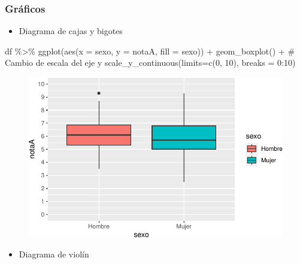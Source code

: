\documentclass[
  a4paper,
]{scrreport}
\newenvironment{Shaded}{\begin{snugshade}}{\end{snugshade}}
\newcommand{\AttributeTok}[1]{\textcolor[rgb]{0.40,0.45,0.13}{#1}}
\newcommand{\CommentTok}[1]{\textcolor[rgb]{0.37,0.37,0.37}{#1}}
\newcommand{\DecValTok}[1]{\textcolor[rgb]{0.68,0.00,0.00}{#1}}
\newcommand{\FunctionTok}[1]{\textcolor[rgb]{0.28,0.35,0.67}{#1}}
\newcommand{\NormalTok}[1]{\textcolor[rgb]{0.00,0.23,0.31}{#1}}
\newcommand{\SpecialCharTok}[1]{\textcolor[rgb]{0.37,0.37,0.37}{#1}}
\providecommand{\tightlist}{%
  \setlength{\itemsep}{0pt}\setlength{\parskip}{0pt}}\usepackage{longtable,booktabs,array}
\theoremstyle{definition}
\theoremstyle{definition}
\theoremstyle{remark}
\begin{document}
\hypertarget{gruxe1ficos-2}{%
\subsubsection{Gráficos}\label{gruxe1ficos-2}}

\begin{itemize}
\tightlist
\item
  Diagrama de cajas y bigotes
\end{itemize}

\begin{Shaded}
\begin{Highlighting}[]
\NormalTok{df }\SpecialCharTok{\%\textgreater{}\%} \FunctionTok{ggplot}\NormalTok{(}\FunctionTok{aes}\NormalTok{(}\AttributeTok{x =}\NormalTok{ sexo, }\AttributeTok{y =}\NormalTok{ notaA, }\AttributeTok{fill =}\NormalTok{ sexo)) }\SpecialCharTok{+} 
  \FunctionTok{geom\_boxplot}\NormalTok{() }\SpecialCharTok{+}
  \CommentTok{\# Cambio de escala del eje y}
  \FunctionTok{scale\_y\_continuous}\NormalTok{(}\AttributeTok{limits=}\FunctionTok{c}\NormalTok{(}\DecValTok{0}\NormalTok{, }\DecValTok{10}\NormalTok{), }\AttributeTok{breaks =} \DecValTok{0}\SpecialCharTok{:}\DecValTok{10}\NormalTok{)}
\end{Highlighting}
\end{Shaded}

\begin{figure}[H]

{\centering \includegraphics{./08-analisis-estadisticos_files/figure-pdf/unnamed-chunk-28-1.pdf}

}

\end{figure}

\begin{itemize}
\tightlist
\item
  Diagrama de violín
\end{itemize}
\end{document}
